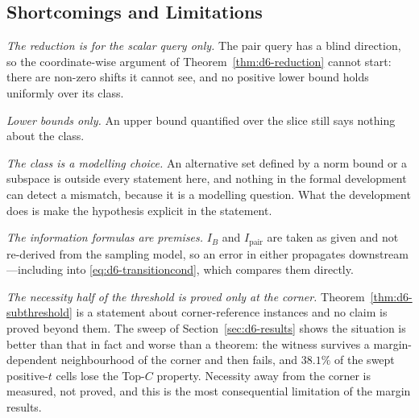 \subsection{Shortcomings and Limitations}

\emph{The reduction is for the scalar query only.} The pair query has a blind direction, so
the coordinate-wise argument of Theorem~\ref{thm:d6-reduction} cannot start: there are non-zero
shifts it cannot see, and no positive lower bound holds uniformly over its class.

\emph{Lower bounds only.} An upper bound quantified over the slice still says nothing about
the class.

\emph{The class is a modelling choice.} An alternative set defined by a norm bound or a
subspace is outside every statement here, and nothing in the formal development can detect a
mismatch, because it is a modelling question. What the development does is make the
hypothesis explicit in the statement.

\emph{The information formulas are premises.} $I_{B}$ and $I_{\mathrm{pair}}$ are taken as
given and not re-derived from the sampling model, so an error in either propagates
downstream---including into \eqref{eq:d6-transitioncond}, which compares them directly.

\emph{The necessity half of the threshold is proved only at the corner.}
Theorem~\ref{thm:d6-subthreshold} is a statement about corner-reference instances and no claim is
proved beyond them. The sweep of Section~\ref{sec:d6-results} shows the situation is better than
that in fact and worse than a theorem: the witness survives a margin-dependent neighbourhood of
the corner and then fails, and $38.1\%$ of the swept positive-$t$ cells lose the Top-$C$
property. Necessity away from the corner is measured, not proved, and this is the most
consequential limitation of the margin results.

